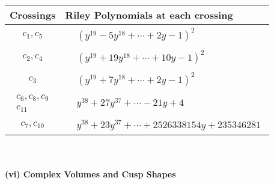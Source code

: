 \documentclass[1p]{elsarticle_modified}
\theoremstyle{definition}
\begin{document}
\begin{tabular}{m{50pt}|m{274pt}}
Crossings & \hspace{64pt}Riley Polynomials at each crossing \\
\hline $$\begin{aligned}c_{1},c_{5}\end{aligned}$$&$\begin{aligned}
&(y^{19}-5 y^{18}+\cdots+2 y-1)^{2}
\end{aligned}$\\
\hline $$\begin{aligned}c_{2},c_{4}\end{aligned}$$&$\begin{aligned}
&(y^{19}+19 y^{18}+\cdots+10 y-1)^{2}
\end{aligned}$\\
\hline $$\begin{aligned}c_{3}\end{aligned}$$&$\begin{aligned}
&(y^{19}+7 y^{18}+\cdots+2 y-1)^{2}
\end{aligned}$\\
\hline $$\begin{aligned}c_{6},c_{8},c_{9}\\c_{11}\end{aligned}$$&$\begin{aligned}
&y^{38}+27 y^{37}+\cdots-21 y+4
\end{aligned}$\\
\hline $$\begin{aligned}c_{7},c_{10}\end{aligned}$$&$\begin{aligned}
&y^{38}+23 y^{37}+\cdots+2526338154 y+235346281
\end{aligned}$\\
\hline
\end{tabular}\\~\\
\newpage\flushleft \textbf{(vi) Complex Volumes and Cusp Shapes}
\end{document}
